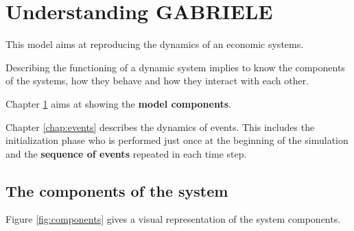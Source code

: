 \documentclass{book}
\begin{document}
\part{Understanding GABRIELE}

This model aims at reproducing the dynamics of an economic systems.

Describing the functioning of a dynamic system implies to know the components of the systems, how they behave and how they interact with each other. 


Chapter \ref{chap:components} aims at showing the \textbf{model components}.


Chapter \ref{chap:events} describes the dynamics of events. This includes the initialization phase who is performed just once at the beginning of the simulation and the \textbf{sequence of events} repeated in each time step.





\newpage

\chapter{The components of the system}\label{chap:components}

Figure \ref{fig:components} gives a visual representation of the system components.
\end{document}

